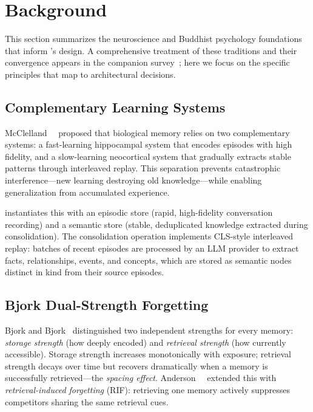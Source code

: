 \section{Background}
\label{sec:background}

This section summarizes the neuroscience and Buddhist psychology foundations
that inform \alaya{}'s design. A comprehensive treatment of these traditions
and their convergence appears in the companion survey~\cite{hui2026taxonomy};
here we focus on the specific principles that map to architectural decisions.

\subsection{Complementary Learning Systems}

McClelland~\etal~\cite{mcclelland1995} proposed that biological memory
relies on two complementary systems: a fast-learning hippocampal system that
encodes episodes with high fidelity, and a slow-learning neocortical system
that gradually extracts stable patterns through interleaved replay. This
separation prevents catastrophic interference---new learning destroying old
knowledge---while enabling generalization from accumulated experience.

\alaya{} instantiates this with an episodic store (rapid, high-fidelity
conversation recording) and a semantic store (stable, deduplicated knowledge
extracted during consolidation). The consolidation operation implements
CLS-style interleaved replay: batches of recent episodes are processed by an
LLM provider to extract facts, relationships, events, and concepts, which
are stored as semantic nodes distinct in kind from their source episodes.

\subsection{Bjork Dual-Strength Forgetting}

Bjork and Bjork~\cite{bjork1992} distinguished two independent strengths for
every memory: \emph{storage strength} (how deeply encoded) and
\emph{retrieval strength} (how currently accessible). Storage strength
increases monotonically with exposure; retrieval strength decays over time
but recovers dramatically when a memory is successfully retrieved---the
\emph{spacing effect}. Anderson~\etal~\cite{anderson1994} extended this with
\emph{retrieval-induced forgetting} (RIF): retrieving one memory actively
suppresses competitors sharing the same retrieval cues.

